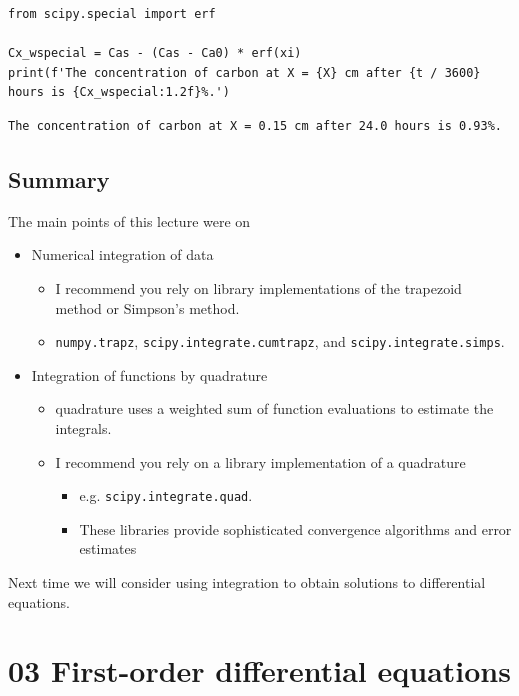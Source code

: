 \documentclass[11pt]{article}
\begin{document}
\begin{verbatim}
from scipy.special import erf

Cx_wspecial = Cas - (Cas - Ca0) * erf(xi)
print(f'The concentration of carbon at X = {X} cm after {t / 3600} hours is {Cx_wspecial:1.2f}%.')
\end{verbatim}

\begin{verbatim}
The concentration of carbon at X = 0.15 cm after 24.0 hours is 0.93%.

\end{verbatim}


\subsection{Summary}
\label{sec:orgec80eae}

The main points of this lecture were on

\begin{itemize}
\item Numerical integration of data
\begin{itemize}
\item I recommend you rely on library implementations of the trapezoid method or Simpson's method.
\item \texttt{numpy.trapz}, \texttt{scipy.integrate.cumtrapz}, and \texttt{scipy.integrate.simps}.
\end{itemize}

\item Integration of functions by quadrature
\begin{itemize}
\item quadrature uses a weighted sum of function evaluations to estimate the integrals.
\item I recommend you rely on a library implementation of a quadrature
\begin{itemize}
\item e.g. \texttt{scipy.integrate.quad}.
\item These libraries provide sophisticated convergence algorithms and error estimates
\end{itemize}
\end{itemize}
\end{itemize}

Next time we will consider using integration to obtain solutions to differential equations.

\section{03 First-order differential equations}
\label{sec:org39b563c}
\end{document}

